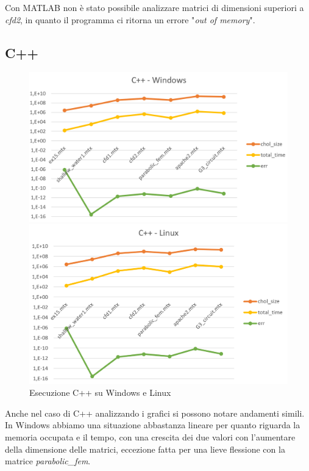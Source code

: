\documentclass[a4paper,12pt]{article}
\begin{document}
\noindent Con MATLAB non è stato possibile analizzare matrici di dimensioni superiori a \textit{cfd2}, in quanto il programma ci ritorna un errore "\textit{out of memory}". 

\subsection{C++}

\begin{figure}[H]
\centering
\begin{minipage}{.5\textwidth}
  \centering
  \includegraphics[width=1\linewidth]{img/c++win.png}
\end{minipage}%
\begin{minipage}{.5\textwidth}
  \centering
  \includegraphics[width=1\linewidth]{img/c++linux.png}
\end{minipage}
\caption{Esecuzione C++ su Windows e Linux}
\end{figure}

Anche nel caso di C++ analizzando i grafici si possono notare andamenti simili.
In Windows abbiamo una situazione abbastanza lineare per quanto riguarda la memoria occupata e il tempo, con una crescita dei due valori con l’aumentare della dimensione delle matrici, eccezione fatta per una lieve flessione con la matrice \textit{parabolic\_fem}. 
\bigskip
\end{document}
